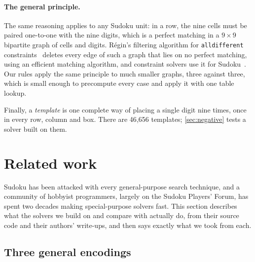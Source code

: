 \documentclass[11pt]{article}
\theoremstyle{definition}
\theoremstyle{plain}
\begin{document}
\paragraph{The general principle.} The same reasoning applies to any Sudoku unit: in a row, the nine cells must be
paired one-to-one with the nine digits, which is a perfect matching in a $9\times 9$ bipartite graph of cells and digits.
R\'egin's filtering algorithm for \texttt{alldifferent} constraints~\cite{regin1994filtering} deletes every edge of such
a graph that lies on no perfect matching, using an efficient matching algorithm, and constraint solvers use it for
Sudoku~\cite{simonis2005sudoku}. Our rules apply the same principle to much smaller graphs, three against three, which
is small enough to precompute every case and apply it with one table lookup.

Finally, a \emph{template} is one complete way of placing a single digit nine times, once in every row, column and
box. There are 46{,}656 templates; \cref{sec:negative} tests a solver built on them.

\section{Related work}
\label{sec:related}
\label{sec:background}

Sudoku has been attacked with every general-purpose search technique, and a community of hobbyist programmers,
largely on the Sudoku Players' Forum, has spent two decades making special-purpose solvers fast. This section
describes what the solvers we build on and compare with actually do, from their source code and their authors'
write-ups, and then says exactly what we took from each.

\subsection{Three general encodings}
\end{document}
